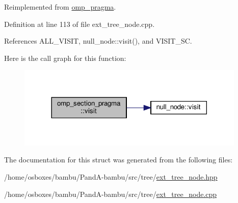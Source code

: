 Reimplemented from \hyperlink{structomp__pragma_a2e2c445528b7e097ae76fa618a9970b5}{omp\+\_\+pragma}.



Definition at line 113 of file ext\+\_\+tree\+\_\+node.\+cpp.



References A\+L\+L\+\_\+\+V\+I\+S\+IT, null\+\_\+node\+::visit(), and V\+I\+S\+I\+T\+\_\+\+SC.

Here is the call graph for this function\+:
\nopagebreak
\begin{figure}[H]
\begin{center}
\leavevmode
\includegraphics[width=308pt]{d9/d69/structomp__section__pragma_af4ab9f80608c36b26779495aacc05e43_cgraph}
\end{center}
\end{figure}


The documentation for this struct was generated from the following files\+:\begin{DoxyCompactItemize}
\item 
/home/osboxes/bambu/\+Pand\+A-\/bambu/src/tree/\hyperlink{ext__tree__node_8hpp}{ext\+\_\+tree\+\_\+node.\+hpp}\item 
/home/osboxes/bambu/\+Pand\+A-\/bambu/src/tree/\hyperlink{ext__tree__node_8cpp}{ext\+\_\+tree\+\_\+node.\+cpp}\end{DoxyCompactItemize}
